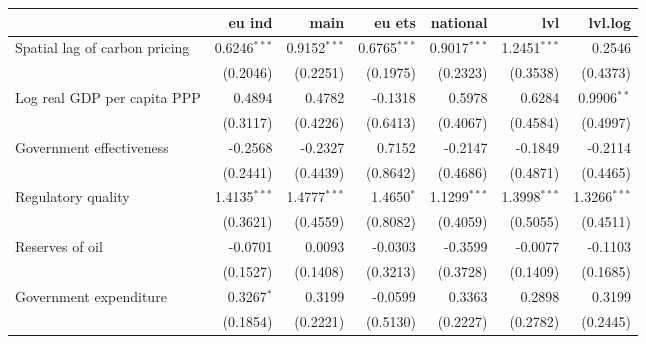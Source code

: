 \begin{tabular}{lrrrrrr}
\toprule
{} &            eu ind &              main &            eu ets &          national &               lvl &           lvl.log \\
\midrule
Spatial lag of carbon pricing    &  0.6246$^{* * *}$ &  0.9152$^{* * *}$ &  0.6765$^{* * *}$ &  0.9017$^{* * *}$ &  1.2451$^{* * *}$ &            0.2546 \\
                                 &          (0.2046) &          (0.2251) &          (0.1975) &          (0.2323) &          (0.3538) &          (0.4373) \\
Log real GDP per capita PPP      &            0.4894 &            0.4782 &           -0.1318 &            0.5978 &            0.6284 &    0.9906$^{* *}$ \\
                                 &          (0.3117) &          (0.4226) &          (0.6413) &          (0.4067) &          (0.4584) &          (0.4997) \\
Government effectiveness         &           -0.2568 &           -0.2327 &            0.7152 &           -0.2147 &           -0.1849 &           -0.2114 \\
                                 &          (0.2441) &          (0.4439) &          (0.8642) &          (0.4686) &          (0.4871) &          (0.4465) \\
Regulatory quality               &  1.4135$^{* * *}$ &  1.4777$^{* * *}$ &      1.4650$^{*}$ &  1.1299$^{* * *}$ &  1.3998$^{* * *}$ &  1.3266$^{* * *}$ \\
                                 &          (0.3621) &          (0.4559) &          (0.8082) &          (0.4059) &          (0.5055) &          (0.4511) \\
Reserves of oil                  &           -0.0701 &            0.0093 &           -0.0303 &           -0.3599 &           -0.0077 &           -0.1103 \\
                                 &          (0.1527) &          (0.1408) &          (0.3213) &          (0.3728) &          (0.1409) &          (0.1685) \\
Government expenditure           &      0.3267$^{*}$ &            0.3199 &           -0.0599 &            0.3363 &            0.2898 &            0.3199 \\
                                 &          (0.1854) &          (0.2221) &          (0.5130) &          (0.2227) &          (0.2782) &          (0.2445) \\

\end{tabular}
